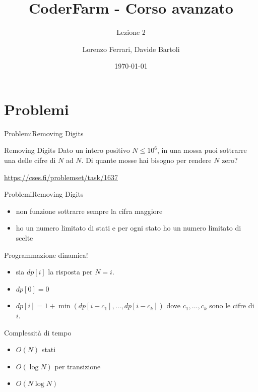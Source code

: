 \documentclass{beamer}
\title{CoderFarm - Corso avanzato}
\subtitle{Lezione 2}
\author{Lorenzo Ferrari, Davide Bartoli}
\date{\today}
\begin{document}
\begin{frame}
    \titlepage
\end{frame}

\section{Problemi}
\begin{frame}{Problemi}{Removing Digits}
    \begin{exampleblock}{Removing Digits}
        Dato un intero positivo $N \leq 10^6$, in una mossa puoi sottrarre una delle cifre di $N$ ad $N$. Di quante mosse hai bisogno per rendere $N$ zero?
    \end{exampleblock}
    \vfill
    \small{\underline{\url{https://cses.fi/problemset/task/1637}}}
\end{frame}

\begin{frame}{Problemi}{Removing Digits}
    \begin{itemize}
        \item non funzione sottrarre sempre la cifra maggiore
        \item ho un numero limitato di stati e per ogni stato ho un numero limitato di scelte
    \end{itemize}
    \pause
    Programmazione dinamica!
    \pause
    \begin{itemize}
        \item sia $dp[i]$ la risposta per $N = i$.
        \item $dp[0] = 0$
        \item $dp[i] = 1 + \min\left( dp[i - c_1], \dots, dp[i - c_k] \right)$ dove $c_1, \dots, c_k$ sono le cifre di $i$.
    \end{itemize}
    \pause
    Complessit\`a di tempo
    \begin{itemize}
        \item $O(N)$ stati
        \item $O(\log N)$ per transizione
        \item $O(N \log N)$
    \end{itemize}
\end{frame}
\end{document}
